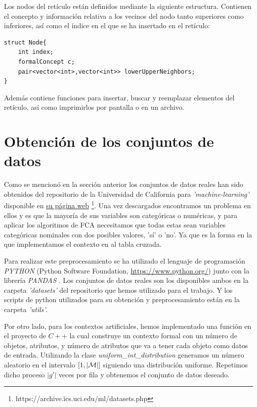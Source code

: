 \documentclass[oneside,openright,titlepage,numbers=noenddot,openany,headinclude,footinclude=true,
cleardoublepage=empty,abstractoff,BCOR=5mm,paper=a4,fontsize=12pt,main=spanish]{scrreprt}
\begin{document}
Los nodos del retículo están definidos mediante la siguiente estructura. Contienen el concepto y información relativa a los vecinos del nodo tanto superiores como inferiores, así como el índice en el que se ha insertado en el retículo:

\begin{verbatim}
struct Node{
    int index;
    formalConcept c;
    pair<vector<int>,vector<int>> lowerUpperNeighbors;
}
\end{verbatim}

Además contiene funciones para insertar, buscar y reemplazar elementos del retículo, así como imprimirlos por pantalla o en un archivo.

\section{Obtención de los conjuntos de datos}

Como se mencionó en la sección anterior los conjuntos de datos reales han sido obtenidos del repositorio de la Universidad de California para \textit{'machine-learning'} disponible en \href{https://archive.ics.uci.edu/ml/datasets.php}{su página web} \footnote{https://archive.ics.uci.edu/ml/datasets.php}. Una vez descargados encontramos un problema en ellos y es que la mayoría de sus variables son categóricas o numéricas, y para aplicar los algoritmos de FCA necesitamos que todas estas sean variables categóricas nominales con dos posibles valores, 'sí' o 'no'. Ya que es la forma en la que implementamos el contexto en al tabla cruzada.

Para realizar este preprocesamiento se ha utilizado el lenguaje de programación \textit{PYTHON} (Python Software Foundation, \url{https://www.python.org/}) junto con la librería \textit{PANDAS} \cite{pandas}. Los conjuntos de datos reales son los disponibles ambos en la carpeta \textit{'datasets'} del repositorio que hemos utilizado para el trabajo. Y los scripts de python utilizados para su obtención y preprocesamiento están en la carpeta \textit{'utils'}.

Por otro lado, para los contextos artificiales, hemos implementado una función en el proyecto de $C++$ la cual construye un contexto formal con un número de objetos, atributos, y número de atributos que va a tener cada objeto como datos de entrada. Utilizando la clase \textit{uniform\_int\_distribution} generamos un número aleatorio en el intervalo $[1,|\mathcal{M}|]$ siguiendo una distribución uniforme. Repetimos dicho proceso $|g'|$ veces por fila y obtenemos el conjunto de datos deseado.
\end{document}
